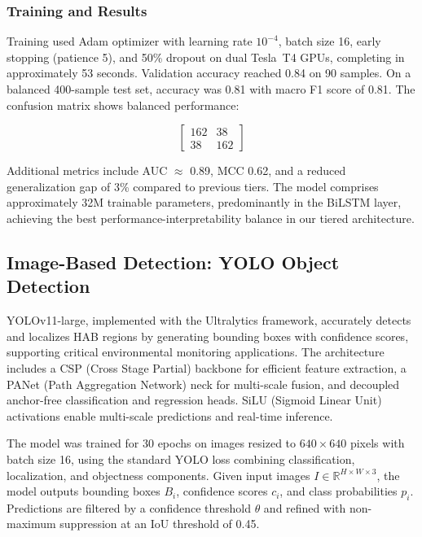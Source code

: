 \documentclass[conference]{IEEEtran}
\begin{document}
\subsubsection{Training and Results}
Training used Adam optimizer with learning rate $10^{-4}$, batch size 16, early stopping (patience 5), and 50\% dropout on dual Tesla~T4 GPUs, completing in approximately 53 seconds. Validation accuracy reached 0.84 on 90 samples. On a balanced 400-sample test set, accuracy was 0.81 with macro F1 score of 0.81. The confusion matrix shows balanced performance:

\begin{equation}
\begin{bmatrix}
162 & 38\\
38 & 162
\end{bmatrix}
\end{equation}

Additional metrics include AUC $\approx$ 0.89, MCC 0.62, and a reduced generalization gap of 3\% compared to previous tiers. The model comprises approximately 32M trainable parameters, predominantly in the BiLSTM layer, achieving the best performance-interpretability balance in our tiered architecture.

\subsection{Image-Based Detection: YOLO Object Detection}

YOLOv11-large, implemented with the Ultralytics framework, accurately detects and localizes HAB regions by generating bounding boxes with confidence scores, supporting critical environmental monitoring applications. The architecture includes a CSP (Cross Stage Partial) backbone for efficient feature extraction, a PANet (Path Aggregation Network) neck for multi-scale fusion, and decoupled anchor-free classification and regression heads. SiLU (Sigmoid Linear Unit) activations enable multi-scale predictions and real-time inference.

The model was trained for 30 epochs on images resized to $640 \times 640$ pixels with batch size 16, using the standard YOLO loss combining classification, localization, and objectness components. Given input images $I \in \mathbb{R}^{H \times W \times 3}$, the model outputs bounding boxes $B_i$, confidence scores $c_i$, and class probabilities $p_i$. Predictions are filtered by a confidence threshold $\theta$ and refined with non-maximum suppression at an IoU threshold of 0.45.
\end{document}
